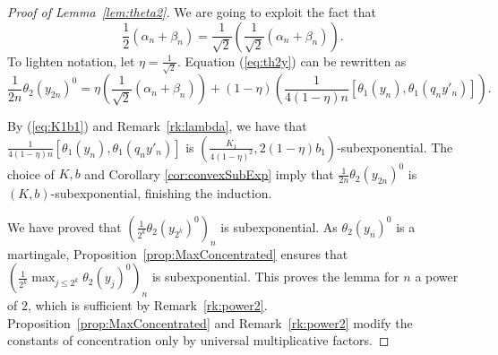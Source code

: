 \documentclass[10pt,a4paper]{amsart}
\begin{document}
\begin{proof}[Proof of Lemma~\ref{lem:theta2}]
We are going to exploit the fact that 
\[
\frac{1}{2}(\alpha_n+\beta_n)=\frac{1}{\sqrt{2}}\left(\frac{1}{\sqrt{2}}(\alpha_n+\beta_n)\right).
\]
To lighten notation, let $\eta=\frac{1}{\sqrt{2}}$. Equation (\ref{eq:th2y}) can be rewritten as
 \[
 \frac{1}{2n}\theta_2(y_{2n})^0= \eta\left(\frac{1}{\sqrt{2}}(\alpha_n+\beta_n)\right)+(1-\eta)\left(\frac{1}{4(1-\eta)n}\left[\theta_1({y}_{n}),\theta_1(q_{n}y'_n)\right]\right).
 \]
 
By (\ref{eq:K1b1}) and Remark~\ref{rk:lambda}, we have that $\frac{1}{4(1-\eta)n}\left[\theta_1({y}_{n}),\theta_1(q_{n}y'_n)\right]$ is $(\frac{K_1}{4(1-\eta)^2},2(1-\eta)b_1)$-subexponential. The choice of $K,b$ and Corollary \ref{cor:convexSubExp} imply that $\frac{1}{2n}\theta_2(y_{2n})^0$ is $(K,b)$-subexponential, finishing the induction.

We have proved that $\left(\frac{1}{2^k}\theta_2(y_{2^k})^0\right)_n$ is subexponential. As $\theta_2(y_n)^0$ is a martingale, Proposition~\ref{prop:MaxConcentrated} ensures that $\left(\frac{1}{2^k}\max_{j\le 2^k}\theta_2(y_j)^0\right)_n$ is subexponential. This proves the lemma for $n$ a power of $2$, which is sufficient by Remark~\ref{rk:power2}. Proposition~\ref{prop:MaxConcentrated} and Remark~\ref{rk:power2} modify the constants of concentration only by universal multiplicative factors.
\end{proof}
\end{document}
